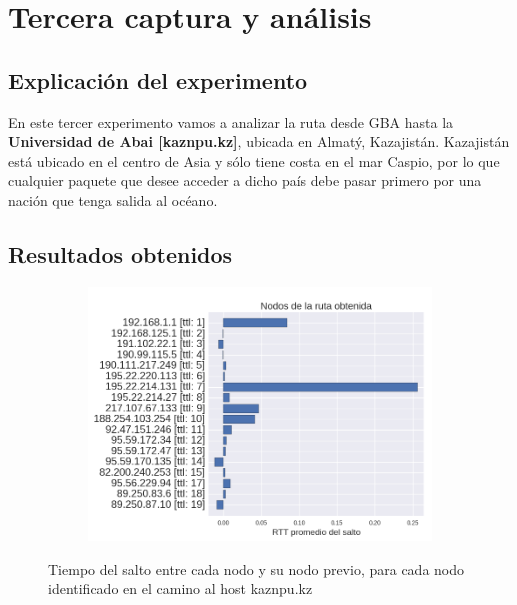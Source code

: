 \section{Tercera captura y análisis}

\subsection{Explicación del experimento}
\par En este tercer experimento vamos a analizar la ruta desde GBA hasta la \textbf{Universidad de Abai [kaznpu.kz]}, ubicada en Almatý, Kazajistán. Kazajistán está ubicado en el centro de Asia y sólo tiene costa en el mar Caspio, por lo que cualquier paquete que desee acceder a dicho país debe pasar primero por una nación que tenga salida al océano.

\subsection{Resultados obtenidos}

\begin{figure}[h!]
  \begin{subfigure}[b]{.5\textwidth}
    \includegraphics[width=\textwidth]{Imagenes/kazajistan_rtts.png}
  \end{subfigure}
  \label{fig:kazajthan_rtts}
  \caption{Tiempo del salto entre cada nodo y su nodo previo, para cada nodo identificado en el camino al host kaznpu.kz}
\end{figure}

